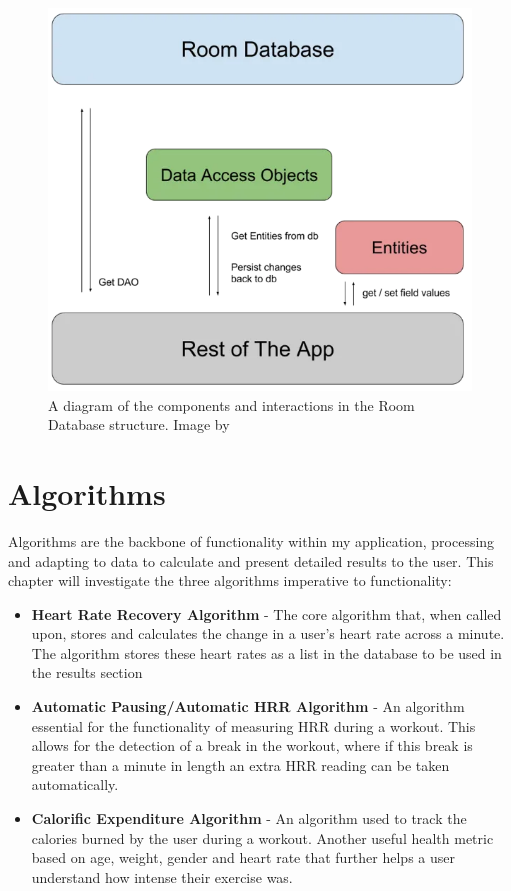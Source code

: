 \documentclass{l4proj}
\begin{document}
\begin{figure}[h]
    \centering
    \includegraphics[width=0.5\linewidth]{dissertation//dissImages/RoomDatabaseStructure.png}
    \caption{A diagram of the components and interactions in the Room Database structure. Image by \cite{Rawat_2019}}
    \label{fig:roomstructure}
\end{figure}

\section{Algorithms}
\label{sec:algorithms}

Algorithms are the backbone of functionality within my application, processing and adapting to data to calculate and present detailed results to the user. This chapter will investigate the three algorithms imperative to functionality:

\begin{itemize}
    \item \textbf{Heart Rate Recovery Algorithm} - The core algorithm that, when called upon, stores and calculates the change in a user’s heart rate across a minute. The algorithm stores these heart rates as a list in the database to be used in the results section
    \item \textbf{Automatic Pausing/Automatic HRR Algorithm} - An algorithm essential for the functionality of measuring HRR during a workout. This allows for the detection of a break in the workout, where if this break is greater than a minute in length an extra HRR reading can be taken automatically.
    \item \textbf{Calorific Expenditure Algorithm} - An algorithm used to track the calories burned by the user during a workout. Another useful health metric based on age, weight, gender and heart rate that further helps a user understand how intense their exercise was.
\end{itemize}
\end{document}
